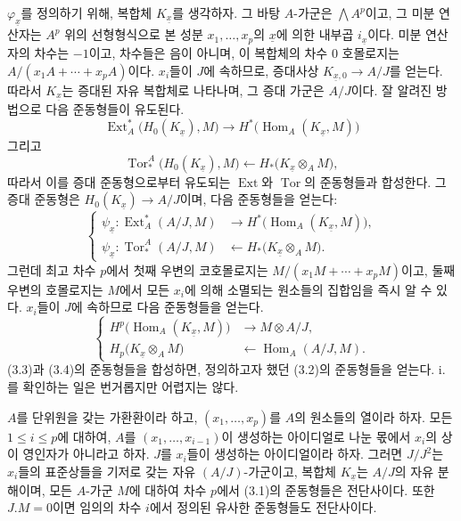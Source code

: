 $\varphi_{\underline{x}}$를 정의하기 위해, 복합체
$K_{\underline{x}}$를 생각하자. 그 바탕 $A$-가군은 $\bigwedge A^{p}$이고,
그 미분 연산자는 $A^{p}$ 위의 선형형식으로 본
성분 $x_1,\ldots,x_p$의 $\underline{x}$에 의한 내부곱 $i_{\underline{x}}$이다.
미분 연산자의 차수는 $-1$이고, 차수들은
음이 아니며, 이 복합체의 차수 $0$ 호몰로지는
$A/(x_1A+\cdots+x_pA)$이다. $x_i$들이 $J$에 속하므로,
증대사상 $K_{\underline{x},0}\longrightarrow A/J$를 얻는다. 따라서
$K_{\underline{x}}$는 증대된 자유 복합체로 나타나며, 그 증대 가군은
$A/J$이다. 잘 알려진 방법으로 다음 준동형들이 유도된다.
\[
\operatorname{Ext}_{A}^{*}\bigl(H_0(K_{\underline{x}}),M\bigr)
\longrightarrow
H^{*}\bigl(\operatorname{Hom}_{A}(K_{\underline{x}},M)\bigr)
\]
그리고
\[
\operatorname{Tor}_{*}^{A}\bigl(H_0(K_{\underline{x}}),M\bigr)
\longleftarrow
H_{*}\bigl(K_{\underline{x}}\otimes_A M\bigr),
\]
따라서 이를 증대 준동형으로부터 유도되는 $\operatorname{Ext}$와
$\operatorname{Tor}$의 준동형들과 합성한다. 그 증대 준동형은
$H_0(K_{\underline{x}})\longrightarrow A/J$이며, 다음 준동형들을 얻는다:
\begin{equation}\tag{3.3}
\left\{
\begin{aligned}
\psi_{\underline{x}}:
\operatorname{Ext}_{A}^{*}(A/J,M)
&\longrightarrow H^{*}\bigl(\operatorname{Hom}_{A}(K_{\underline{x}},M)\bigr),\\
\psi_{\underline{x}}:
\operatorname{Tor}_{*}^{A}(A/J,M)
&\longleftarrow H_{*}\bigl(K_{\underline{x}}\otimes_A M\bigr).
\end{aligned}
\right.
\end{equation}
그런데 최고 차수 $p$에서 첫째 우변의 코호몰로지는
$M/(x_1M+\cdots+x_pM)$이고, 둘째 우변의 호몰로지는 $M$에서
모든 $x_i$에 의해 소멸되는 원소들의 집합임을 즉시 알 수 있다. $x_i$들이 $J$에 속하므로
다음 준동형들을 얻는다.
\begin{equation}\tag{3.4}
\left\{
\begin{aligned}
H^{p}\bigl(\operatorname{Hom}_{A}(K_{\underline{x}},M)\bigr)
&\longrightarrow M\otimes A/J,\\
H_{p}\bigl(K_{\underline{x}}\otimes_A M\bigr)
&\longleftarrow\operatorname{Hom}_{A}(A/J,M).
\end{aligned}
\right.
\end{equation}
(3.3)과 (3.4)의 준동형들을 합성하면, 정의하고자 했던 (3.2)의
준동형들을 얻는다. i.를 확인하는 일은 번거롭지만
어렵지는 않다.

 $A$를 단위원을 갖는 가환환이라 하고,
$(x_1,\ldots,x_p)$를 $A$의 원소들의 열이라 하자.
모든 $1\leq i\leq p$에 대하여, $A$를 $(x_1,\ldots,x_{i-1})$이 생성하는 아이디얼로 나눈 몫에서
$x_i$의 상이 영인자가 아니라고 하자. $J$를 $x_i$들이 생성하는 아이디얼이라 하자.
그러면 $J/J^{2}$는 $x_i$들의 표준상들을 기저로 갖는 자유 $(A/J)$-가군이고,
복합체 $K_{\underline{x}}$는 $A/J$의 자유 분해이며, 모든
$A$-가군 $M$에 대하여 차수 $p$에서 (3.1)의 준동형들은
전단사이다. 또한 $J.M=0$이면 임의의 차수 $i$에서 정의된 유사한
준동형들도 전단사이다.

